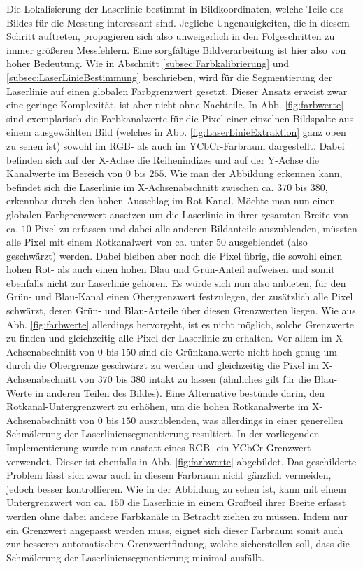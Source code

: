 Die Lokalisierung der Laserlinie bestimmt in Bildkoordinaten, welche Teile des Bildes für die Messung interessant sind. Jegliche Ungenauigkeiten, die in diesem Schritt auftreten, propagieren sich also unweigerlich in den Folgeschritten zu immer größeren Messfehlern. Eine sorgfältige Bildverarbeitung ist hier also von hoher Bedeutung.\bigbreak
Wie in Abschnitt \ref{subsec:Farbkalibrierung} und \ref{subsec:LaserLinieBestimmung} beschrieben, wird für die Segmentierung der Laserlinie auf einen globalen Farbgrenzwert gesetzt. Dieser Ansatz erweist zwar eine geringe Komplexität, ist aber nicht ohne Nachteile. In Abb. \ref{fig:farbwerte} sind exemplarisch die Farbkanalwerte für die Pixel einer einzelnen Bildspalte aus einem ausgewählten Bild (welches in Abb. \ref{fig:LaserLinieExtraktion} ganz oben zu sehen ist) sowohl im RGB- als auch im YCbCr-Farbraum dargestellt. Dabei befinden sich auf der X-Achse die Reihenindizes und auf der Y-Achse die Kanalwerte im Bereich von \(0\) bis \(255\). Wie man der Abbildung erkennen kann, befindet sich die Laserlinie im X-Achsenabschnitt zwischen ca. \(370\) bis \(380\), erkennbar durch den hohen Ausschlag im Rot-Kanal. Möchte man nun einen globalen Farbgrenzwert ansetzen um die Laserlinie in ihrer gesamten Breite von ca. \(10\) Pixel zu erfassen und dabei alle anderen Bildanteile auszublenden, müssten alle Pixel mit einem Rotkanalwert von ca. unter \(50\) ausgeblendet (also geschwärzt) werden. Dabei bleiben aber noch die Pixel übrig, die sowohl einen hohen Rot- als auch einen hohen Blau und Grün-Anteil aufweisen und somit ebenfalls nicht zur Laserlinie gehören. Es würde sich nun also anbieten, für den Grün- und Blau-Kanal einen Obergrenzwert festzulegen, der zusätzlich alle Pixel schwärzt, deren Grün- und Blau-Anteile über diesen Grenzwerten liegen. Wie aus Abb. \ref{fig:farbwerte} allerdings hervorgeht, ist es nicht möglich, solche Grenzwerte zu finden und gleichzeitig alle Pixel der Laserlinie zu erhalten. Vor allem im X-Achsenabschnitt von \(0\) bis \(150\) sind die Grünkanalwerte nicht hoch genug um durch die Obergrenze geschwärzt zu werden und gleichzeitig die Pixel im X-Achsenabschnitt von \(370\) bis \(380\) intakt zu lassen (ähnliches gilt für die Blau-Werte in anderen Teilen des Bildes). Eine Alternative bestünde darin, den Rotkanal-Untergrenzwert zu erhöhen, um die hohen Rotkanalwerte im X-Achsenabschnitt von \(0\) bis \(150\) auszublenden, was allerdings in einer generellen Schmälerung der Laserliniensegmentierung resultiert.\linebreak
In der vorliegenden Implementierung wurde nun anstatt eines RGB- ein YCbCr-Grenzwert verwendet. Dieser ist ebenfalls in Abb. \ref{fig:farbwerte} abgebildet. Das geschilderte Problem lässt sich zwar auch in diesem Farbraum nicht gänzlich vermeiden, jedoch besser kontrollieren. Wie in der Abbildung zu sehen ist, kann mit einem Untergrenzwert von ca. \(150\) die Laserlinie in einem Großteil ihrer Breite erfasst werden ohne dabei andere Farbkanäle in Betracht ziehen zu müssen. Indem nur ein Grenzwert angepasst werden muss, eignet sich dieser Farbraum somit auch zur besseren automatischen Grenzwertfindung, welche sicherstellen soll, dass die Schmälerung der Laserliniensegmentierung minimal ausfällt.   
